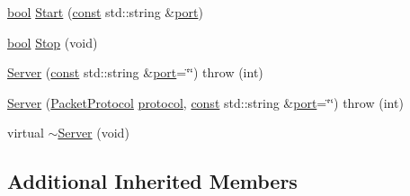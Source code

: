 \begin{DoxyCompactItemize}
\item 
\hyperlink{term__entry_8h_a002004ba5d663f149f6c38064926abac}{bool} \hyperlink{classbpt_1_1_net_com_1_1_server_a9a27020be55075686ea85695b1e4c1db}{Start} (\hyperlink{term__entry_8h_a57bd63ce7f9a353488880e3de6692d5a}{const} std\-::string \&\hyperlink{classbpt_1_1_net_com_1_1_communicator_a6b6676ed095581315ffc75dd7d9a1ceb}{port})
\item 
\hyperlink{term__entry_8h_a002004ba5d663f149f6c38064926abac}{bool} \hyperlink{classbpt_1_1_net_com_1_1_server_a6d96755ef4082b108acbc07b48a6647b}{Stop} (void)
\item 
\hyperlink{classbpt_1_1_net_com_1_1_server_a154eccb991131f110adc7f1bad9ffc71}{Server} (\hyperlink{term__entry_8h_a57bd63ce7f9a353488880e3de6692d5a}{const} std\-::string \&\hyperlink{classbpt_1_1_net_com_1_1_communicator_a6b6676ed095581315ffc75dd7d9a1ceb}{port}=\char`\"{}\char`\"{})  throw (int)
\item 
\hyperlink{classbpt_1_1_net_com_1_1_server_a83f3820fc512482c4893b037b57d1f0c}{Server} (\hyperlink{namespacebpt_1_1_net_com_ae55ee05019d82af5d3cc17e7e0ebedff}{Packet\-Protocol} \hyperlink{classbpt_1_1_net_com_1_1_communicator_aac1e2e8c0b91c11f347c042e56f46041}{protocol}, \hyperlink{term__entry_8h_a57bd63ce7f9a353488880e3de6692d5a}{const} std\-::string \&\hyperlink{classbpt_1_1_net_com_1_1_communicator_a6b6676ed095581315ffc75dd7d9a1ceb}{port}=\char`\"{}\char`\"{})  throw (int)
\item 
virtual \hyperlink{classbpt_1_1_net_com_1_1_server_a4567255323f117920db4175e26fea252}{$\sim$\-Server} (void)
\end{DoxyCompactItemize}
\subsection*{Additional Inherited Members}


